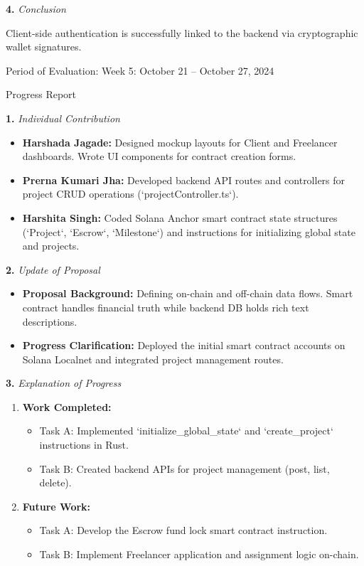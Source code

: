 \documentclass[12pt]{article}
\newcommand{\phasetitle}[1]{{\large Period of Evaluation: #1}\par\vspace{4pt}}
\newcommand{\progressreport}{{\large Progress Report}\par\vspace{4pt}}
\newcommand{\subhead}[2]{\textbf{#1.} \textit{#2}\par}
\begin{document}
\subhead{4}{Conclusion}
Client-side authentication is successfully linked to the backend via cryptographic wallet signatures.

\newpage

\phasetitle{Week 5: October 21 -- October 27, 2024}

\progressreport

\subhead{1}{Individual Contribution}
\begin{itemize}[leftmargin=2em]
    \item \textbf{Harshada Jagade:} Designed mockup layouts for Client and Freelancer dashboards. Wrote UI components for contract creation forms.
    \item \textbf{Prerna Kumari Jha:} Developed backend API routes and controllers for project CRUD operations (`projectController.ts`).
    \item \textbf{Harshita Singh:} Coded Solana Anchor smart contract state structures (`Project`, `Escrow`, `Milestone`) and instructions for initializing global state and projects.
\end{itemize}

\subhead{2}{Update of Proposal}
\begin{itemize}[leftmargin=2em]
    \item \textbf{Proposal Background:} Defining on-chain and off-chain data flows. Smart contract handles financial truth while backend DB holds rich text descriptions.
    \item \textbf{Progress Clarification:} Deployed the initial smart contract accounts on Solana Localnet and integrated project management routes.
\end{itemize}

\newpage

\subhead{3}{Explanation of Progress}
\begin{enumerate}[leftmargin=2em]
    \item \textbf{Work Completed:}
    \begin{itemize}[leftmargin=2em]
        \item Task A: Implemented `initialize\_global\_state` and `create\_project` instructions in Rust.
        \item Task B: Created backend APIs for project management (post, list, delete).
    \end{itemize}
    \item \textbf{Future Work:}
    \begin{itemize}[leftmargin=2em]
        \item Task A: Develop the Escrow fund lock smart contract instruction.
        \item Task B: Implement Freelancer application and assignment logic on-chain.
    \end{itemize}
\end{enumerate}
\end{document}
